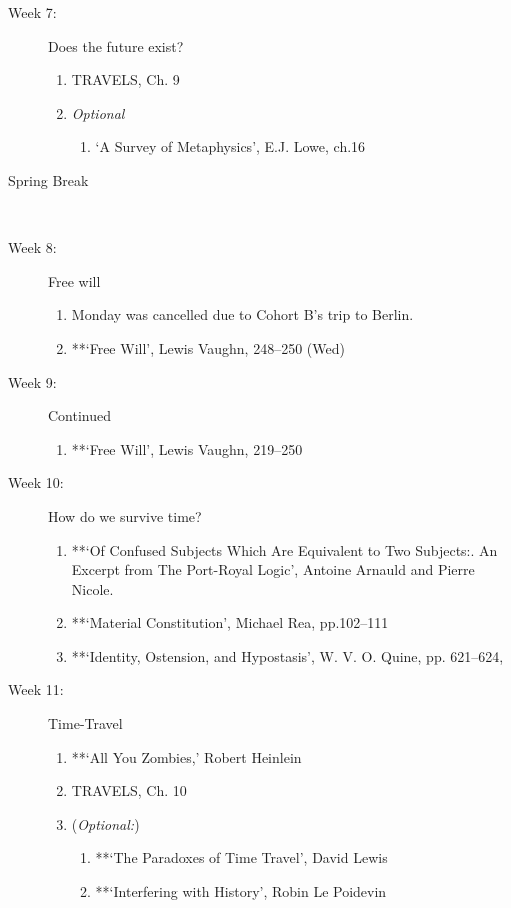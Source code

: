 \documentclass[article,oneside]{memoir}
\begin{document}
\begin{description}
\item[Week 7:] Does the future exist? 
\begin{enumerate}
\item TRAVELS, Ch. 9
\item \emph{Optional}
\begin{enumerate}
\item `A Survey of Metaphysics', E.J. Lowe, ch.16
\end{enumerate}
\end{enumerate}
\item[Spring Break]\


\item[Week 8:] Free will
\begin{enumerate}
\item Monday was cancelled due to Cohort B's trip to Berlin.
\item **`Free Will', Lewis Vaughn, 248--250 (Wed)
\end{enumerate}


\item[Week 9:]  Continued
\begin{enumerate}
\item **`Free Will', Lewis Vaughn, 219--250 

\end{enumerate}

\item[Week 10:] How do we survive time?
\begin{enumerate}
\item **`Of Confused Subjects Which Are Equivalent to Two Subjects:. An Excerpt from The Port-Royal Logic', Antoine Arnauld and Pierre Nicole.
\item **`Material Constitution', Michael Rea, pp.102--111 
 \item **`Identity, Ostension, and Hypostasis',  W. V. O. Quine, pp. 621--624,

\end{enumerate}

\item[Week 11:]  Time-Travel
\begin{enumerate}
\item **`All You Zombies,'  Robert Heinlein
\item TRAVELS, Ch. 10 
\item (\emph{Optional:})
\begin{enumerate}
\item **`The Paradoxes of Time Travel', David Lewis
\item **`Interfering with History', Robin Le Poidevin 
\end{enumerate}
\end{enumerate}


\end{description}
\end{document}
